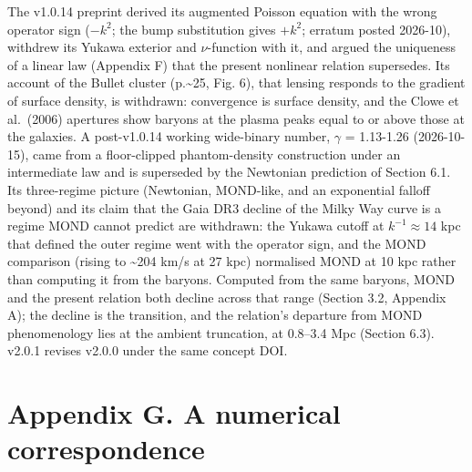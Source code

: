 \documentclass[
  10pt,
]{article}
\begin{document}
The v1.0.14 preprint derived its augmented Poisson equation with the wrong operator sign ($-k^2$; the bump substitution gives $+k^2$; erratum posted 2026-10), withdrew its Yukawa exterior and $\nu$-function with it, and argued the uniqueness of a linear law (Appendix F) that the present nonlinear relation supersedes. Its account of the Bullet cluster (p.\textasciitilde{}25, Fig. 6), that lensing responds to the gradient of surface density, is withdrawn: convergence is surface density, and the Clowe et al.~(2006) apertures show baryons at the plasma peaks equal to or above those at the galaxies. A post-v1.0.14 working wide-binary number, $\gamma$ = 1.13-1.26 (2026-10-15), came from a floor-clipped phantom-density construction under an intermediate law and is superseded by the Newtonian prediction of Section 6.1. Its three-regime picture (Newtonian, MOND-like, and an exponential falloff beyond) and its claim that the Gaia DR3 decline of the Milky Way curve is a regime MOND cannot predict are withdrawn: the Yukawa cutoff at $k^{-1}\approx14$ kpc that defined the outer regime went with the operator sign, and the MOND comparison (rising to \textasciitilde{}204 km/s at 27 kpc) normalised MOND at 10 kpc rather than computing it from the baryons. Computed from the same baryons, MOND and the present relation both decline across that range (Section 3.2, Appendix A); the decline is the transition, and the relation's departure from MOND phenomenology lies at the ambient truncation, at 0.8--3.4 Mpc (Section 6.3). v2.0.1 revises v2.0.0 under the same concept DOI.

\section{Appendix G. A numerical correspondence}\label{appendix-g}
\end{document}
